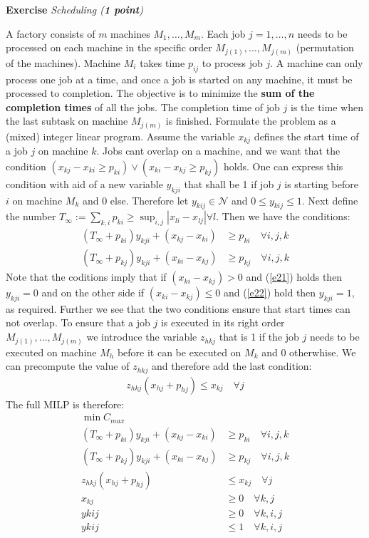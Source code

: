 \documentclass[a4paper,10pt]{article}
\newcounter{exc}
\newenvironment{exercise}[1]%
{\refstepcounter{exc}\textbf{Exercise \arabic{exc}} \emph{#1}\\}
{

\hrulefill\medskip}%
\begin{document}
\begin{exercise}{Scheduling (\textbf{1 point})}\label{ex:jss}

A factory consists of $m$ machines $M_1, \dots, M_m$.
Each job $j=1,\ldots,n$ needs to be processed on each machine in the specific order $M_{j(1)},\dots,M_{j(m)}$ (permutation of the machines). Machine $M_i$ takes time $p_{ij}$ to process job $j$. A machine can only process one job at a time, and once a job is started on any machine, it must be processed to completion. The objective is to minimize the \textbf{sum of the completion times} of all the jobs. The completion time of job $j$ is the time when the last subtask on machine $M_{j(m)}$ is finished. Formulate the problem as a (mixed) integer linear program.
  Assume the variable $x_{kj}$ defines the start time of a  job $j$ on machine $k$. Jobs cant overlap on a machine, and we want that the condition $(x_{kj} - x_{ki}\geq p_{ki}) \vee (x_{ki} - x_{kj}\geq p_{kj})$ holds. One can express this condition with aid of a new variable $y_{kji}$ that shall be 1 if job $j$ is starting before $i$ on machine $M_k$ and 0 else. Therefore let $y_{kij}\in \mathcal{N}$ and $0\leq y_{kij}\leq 1$. Next define the number $T_{\infty} := \sum_{k,i}p_{ki}\geq \sup_{i,j}|x_{li}-x_{lj}| \forall l$. 
Then we have the conditions:
\begin{align}
  (T_\infty+p_{ki})y_{kji} + (x_{kj} - x_{ki}) & \geq p_{ki} \quad \forall i,j,k\label{e21}\\ 
  (T_\infty+p_{kj})y_{kji} + (x_{ki} - x_{kj}) & \geq p_{kj} \quad \forall i,j,k\label{e22}
\end{align}
  Note that the coditions imply that if $(x_{ki} - x_{kj})>0 $ and (\ref{e21}) holds then $y_{kji}=0$ and on the other side if $(x_{ki} - x_{kj})\leq 0$ and (\ref{e22}) hold then $y_{kji} =1 $, as required. Further we see that the two conditions ensure that start times can not overlap. 
  To ensure that a job $j$ is executed in its right order $M_{j(1)},\dots,M_{j(m)}$ we introduce the variable $z_{hkj}$ that is 1 if the job $j$ needs to be executed on machine $M_h$ before it can be executed on $M_k$ and 0 otherwhise. We can precompute the value of $z_{hkj}$ and therefore add the last condition:
\begin{align}
  z_{hkj}(x_{hj} + p_{hj}) \leq x_{kj} \quad\forall j
\end{align}
The full MILP is therefore:
\begin{align}
  \min C_{max} \\
  (T_\infty+p_{ki})y_{kji} + (x_{kj} - x_{ki}) & \geq p_{ki} \quad \forall i,j,k \\ 
  (T_\infty+p_{kj})y_{kji} + (x_{ki} - x_{kj}) & \geq p_{kj} \quad \forall i,j,k \\
  z_{hkj}(x_{hj} + p_{hj}) & \leq x_{kj} \quad \forall j \\
  x_{kj} & \geq 0 \quad\forall k,j \\
  y{kij} & \geq 0 \quad\forall k,i,j \\
  y{kij} & \leq 1 \quad\forall k,i,j \\
\end{align}

\end{exercise}
\end{document}
